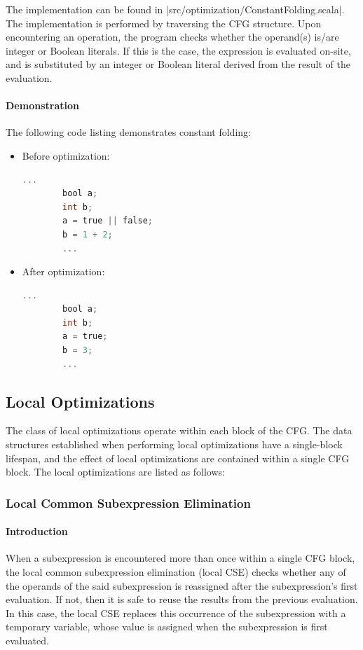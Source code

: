 The implementation can be found in |src/optimization/ConstantFolding.scala|. The implementation is performed by traversing the CFG structure. Upon encountering an operation, the program checks whether the operand(s) is/are integer or Boolean literals. If this is the case, the expression is evaluated on-site, and is substituted by an integer or Boolean literal derived from the result of the evaluation.

\paragraph{Demonstration}
The following code listing demonstrates constant folding:

\begin{itemize}
    \item Before optimization:
    \begin{lstlisting}[language=C]
        ...
        bool a;
        int b;
        a = true || false;
        b = 1 + 2;
        ...
    \end{lstlisting}
    \item After optimization:
    \begin{lstlisting}[language=C]
        ...
        bool a;
        int b;
        a = true;
        b = 3;
        ...
    \end{lstlisting}
\end{itemize}

\subsection{Local Optimizations}

The class of local optimizations operate within each block of the CFG. The data structures established when performing local optimizations have a single-block lifespan, and the effect of local optimizations are contained within a single CFG block. The local optimizations are listed as follows:

\subsubsection{Local Common Subexpression Elimination}

\paragraph{Introduction}

When a subexpression is encountered more than once within a single CFG block, the local common subexpression elimination (local CSE) checks whether any of the operands of the said subexpression is reassigned after the subexpression's first evaluation. If not, then it is safe to reuse the results from the previous evaluation. In this case, the local CSE replaces this occurrence of the subexpression with a temporary variable, whose value is assigned when the subexpression is first evaluated.

